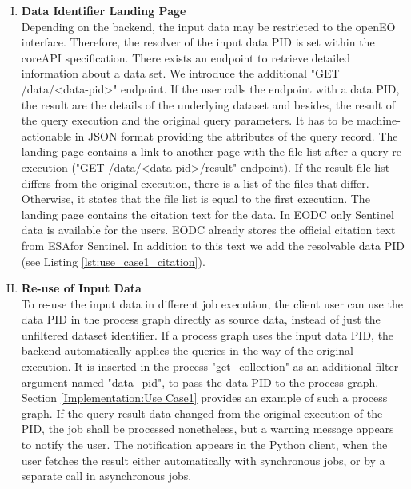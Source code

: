 \documentclass[draft,final]{vutinfth} %
\begin{document}
\begin{enumerate}[I.]
\newpage
\item \textbf{Data Identifier Landing Page} \\
	Depending on the backend, the input data may be restricted to the openEO interface. Therefore, the resolver of the input data PID is set within the coreAPI specification. There exists an endpoint to retrieve detailed information about a data set. We introduce the additional "GET /data/<data-pid>" endpoint. If the user calls the endpoint with a data PID, the result are the details of the underlying dataset and besides, the result of the query execution and the original query parameters. {It has to be machine-actionable in JSON format providing the attributes of the query record.} The landing page contains a link to another page with the file list after a query re-execution ("GET /data/<data-pid>/result" endpoint). If the result file list differs from the original execution, there is a list of the files that differ. Otherwise, it states that the file list is equal to the first execution. 
	{The landing page contains the citation text for the data. In EODC only Sentinel data is available for the users. EODC already stores the official citation text from ESAfor Sentinel. In addition to this text we add the resolvable data PID (see Listing \ref{lst:use_case1_citation}).}


\item \textbf{Re-use of Input Data} \\
	To re-use the input data in different job execution, the client user can use the data PID in the process graph directly as source data, instead of just the unfiltered dataset identifier. If a process graph uses the input data PID, the backend automatically applies the queries in the way of the original execution. It is inserted in the process "get\_collection" as an additional filter argument named "data\_pid", to pass the data PID to the process graph. Section \ref{Implementation:Use Case1} provides an example of such a process graph. If the query result data changed from the original execution of the PID, the job shall be processed nonetheless, but a warning message appears to notify the user. {The notification appears in the Python client, when the user fetches the result either automatically with synchronous jobs, or by a separate call in asynchronous jobs.}   
\end{enumerate}
\end{document}
